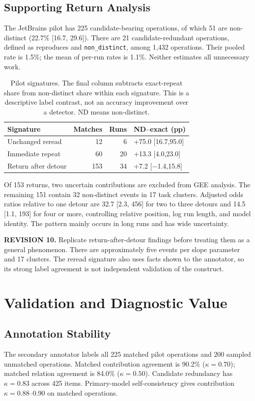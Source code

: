 \documentclass[10pt,a4paper,twocolumn]{article}
\newcommand{\rev}[2]{\par\smallskip\noindent\begin{minipage}{\linewidth}\color{revision}\footnotesize\textbf{REVISION #1.} #2\end{minipage}\par\smallskip}
\newcommand{\nd}{\texttt{non\_distinct}}
\begin{document}
\subsection{Supporting Return Analysis}
The JetBrains pilot has 225 candidate-bearing operations, of which 51 are non-distinct (22.7\% [16.7, 29.6]). There are 21 candidate-redundant operations, defined as reproduces and \nd, among 1,432 operations. Their pooled rate is 1.5\%; the mean of per-run rates is 1.1\%. Neither estimates all unnecessary work.
\begin{table}[t]
\centering\small\setlength{\tabcolsep}{3pt}
\begin{tabular}{lrrl}
\toprule
Signature & Matches & Runs & ND--exact (pp)\\
\midrule
Unchanged reread & 12 & 6 & +75.0 [16.7,95.0]\\
Immediate repeat & 60 & 20 & +13.3 [4.0,23.0]\\
Return after detour & 153 & 34 & +7.2 [$-$1.4,15.8]\\
\bottomrule
\end{tabular}
\caption{Pilot signatures. The final column subtracts exact-repeat share from non-distinct share within each signature. This is a descriptive label contrast, not an accuracy improvement over a detector. ND means non-distinct.}
\label{tab:signatures}
\end{table}
Of 153 returns, two uncertain contributions are excluded from GEE analysis. The remaining 151 contain 32 non-distinct events in 17 task clusters. Adjusted odds ratios relative to one detour are 32.7 [2.3, 456] for two to three detours and 14.5 [1.1, 193] for four or more, controlling relative position, log run length, and model identity. The pattern mainly occurs in long runs and has wide uncertainty.
\rev{10}{Replicate return-after-detour findings before treating them as a general phenomenon. There are approximately five events per slope parameter and 17 clusters. The reread signature also uses facts shown to the annotator, so its strong label agreement is not independent validation of the construct.}

\section{Validation and Diagnostic Value}
\subsection{Annotation Stability}
The secondary annotator labels all 225 matched pilot operations and 200 sampled unmatched operations. Matched contribution agreement is 90.2\% ($\kappa=0.70$); matched relation agreement is 84.0\% ($\kappa=0.50$). Candidate redundancy has $\kappa=0.83$ across 425 items. Primary-model self-consistency gives contribution $\kappa=0.88$--0.90 on matched operations.
\end{document}
